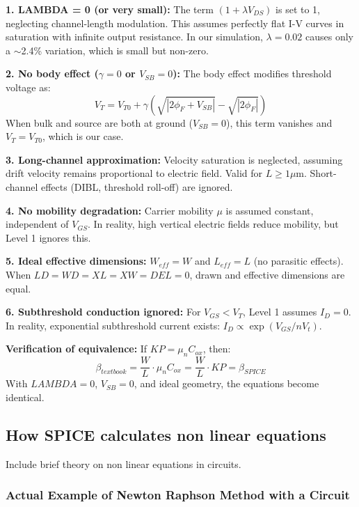 \documentclass[a4paper,12pt]{article}
\begin{document}
\textbf{1. LAMBDA = 0 (or very small):}
The term $(1 + \lambda V_{DS})$ is set to 1, neglecting channel-length modulation. This assumes perfectly flat I-V curves in saturation with infinite output resistance. In our simulation, $\lambda = 0.02$ causes only a $\sim$2.4\% variation, which is small but non-zero.

\textbf{2. No body effect ($\gamma = 0$ or $V_{SB} = 0$):}
The body effect modifies threshold voltage as:
\begin{equation}
V_T = V_{T0} + \gamma(\sqrt{|2\phi_F + V_{SB}|} - \sqrt{|2\phi_F|})
\end{equation}
When bulk and source are both at ground ($V_{SB} = 0$), this term vanishes and $V_T = V_{T0}$, which is our case.

\textbf{3. Long-channel approximation:}
Velocity saturation is neglected, assuming drift velocity remains proportional to electric field. Valid for $L \geq 1\mu$m. Short-channel effects (DIBL, threshold roll-off) are ignored.

\textbf{4. No mobility degradation:}
Carrier mobility $\mu$ is assumed constant, independent of $V_{GS}$. In reality, high vertical electric fields reduce mobility, but Level 1 ignores this.

\textbf{5. Ideal effective dimensions:}
$W_{eff} = W$ and $L_{eff} = L$ (no parasitic effects). When $LD = WD = XL = XW = DEL = 0$, drawn and effective dimensions are equal.

\textbf{6. Subthreshold conduction ignored:}
For $V_{GS} < V_T$, Level 1 assumes $I_D = 0$. In reality, exponential subthreshold current exists: $I_D \propto \exp(V_{GS}/nV_t)$.

\textbf{Verification of equivalence:}
If $KP = \mu_n C_{ox}$, then:
\begin{equation}
\beta_{textbook} = \frac{W}{L} \cdot \mu_n C_{ox} = \frac{W}{L} \cdot KP = \beta_{SPICE}
\end{equation}
With $LAMBDA = 0$, $V_{SB} = 0$, and ideal geometry, the equations become identical.

\subsection{How SPICE calculates non linear equations}
Include brief theory on non linear equations in circuits.

\subsubsection{Actual Example of Newton Raphson Method with a Circuit}
\end{document}
